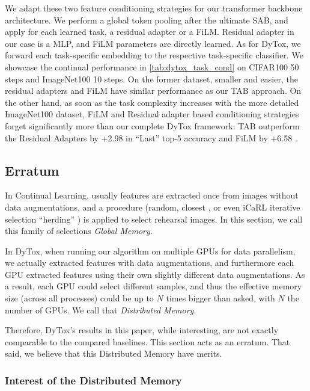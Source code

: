 We adapt these two feature conditioning strategies for our transformer backbone architecture. We
perform a global token pooling after the ultimate SAB, and apply for each learned task, a residual
adapter or a FiLM. Residual adapter in our case is a MLP, and FiLM parameters are directly learned.
As for DyTox, we forward each task-specific embedding to the respective task-specific classifier. We
showcase the continual performance in \autoref{tab:dytox_task_cond} on CIFAR100 50 steps and
ImageNet100 10 steps. On the former dataset, smaller and easier,  the residual adapters and FiLM
have similar performance as our TAB approach. On the other hand, as soon as the task complexity
increases with the more detailed ImageNet100 dataset, FiLM and Residual adapter based conditioning
strategies forget significantly more than our complete DyTox framework: TAB outperform the Residual
Adapters by +2.98 \pp in ``Last'' top-5 accuracy and FiLM by +6.58 \pp.

\subsection{Erratum}

In Continual Learning, usually features are extracted once from images without data augmentations, and a procedure (random, closest \citep{castro2018end_to_end_inc_learn}, or even iCaRL iterative selection ``herding'' \citep{rebuffi2017icarl}) is applied to select rehearsal images. In this section, we call this family of selections \textit{Global Memory}.

In DyTox, when running our algorithm on multiple GPUs for data parallelism, we actually extracted features with data augmentations, and furthermore each GPU extracted features using their own slightly different data augmentations. As a result, each GPU could select different samples, and thus the effective memory size (across all processes) could be up to $N$ times bigger than asked, with $N$ the number of GPUs. We call that \textit{Distributed Memory}.


Therefore, DyTox's results in this paper, while interesting, are not exactly comparable to the compared baselines. This section acts as an erratum. That said, we believe that this Distributed Memory have merits.

\subsubsection{Interest of the Distributed Memory}

